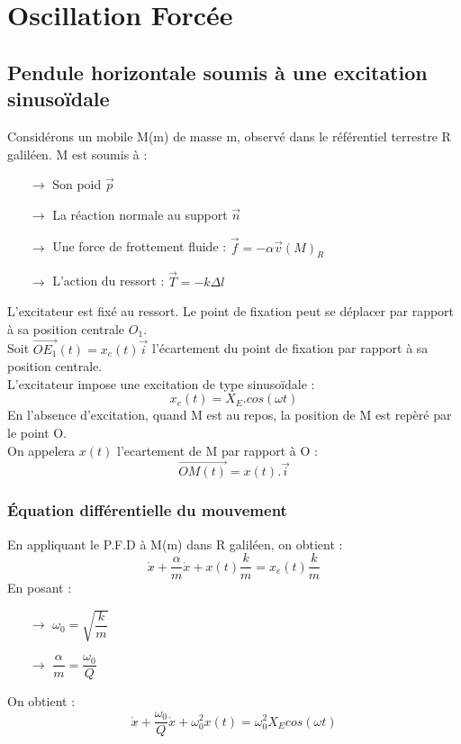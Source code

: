 \chapter{Oscillation Forcée}
\section{Pendule horizontale soumis à une excitation sinusoïdale}
Considérons un mobile M(m) de masse m, observé dans le référentiel terrestre R galiléen. M est soumis à :
\begin{itemize}
 \item[$\rightarrow$] Son poid $\overrightarrow{p}$
 \item[$\rightarrow$] La réaction normale au support $\overrightarrow{n}$
 \item[$\rightarrow$] Une force de frottement fluide : $\overrightarrow{f}=-\alpha\overrightarrow{v}(M)_R$
 \item[$\rightarrow$] L'action du ressort : $\overrightarrow{T} = -k\Delta l$
\end{itemize}
L'excitateur est fixé au ressort. Le point de fixation peut se déplacer par rapport à sa position centrale $O_1$.\\
Soit $\overrightarrow{OE_1}(t) = x_e(t)\overrightarrow{i}$ l'écartement du point de fixation par rapport à sa position centrale.\\
L'excitateur impose une excitation de type sinusoïdale :
$$x_e(t) = X_E.cos(\omega t)$$
En l'absence d'excitation, quand M est au repos, la position de M est repèré par le point O.\\
On appelera $x(t)$ l'ecartement de M par rapport à O : 
$$\overrightarrow{OM(t)} = x(t).\overrightarrow{i}$$
\subsection{Équation différentielle du mouvement}
En appliquant le P.F.D à M(m) dans R galiléen, on obtient : 
$$\mathring{x}\mathring{} + \dfrac{\alpha}{m}\mathring{x} +x(t)\dfrac{k}{m} =x_e(t)\dfrac{k}{m}$$
En posant : 
\begin{itemize}
 \item[$\rightarrow$] $\omega_0 = \sqrt{\dfrac{k}{m}}$\\
 \item[$\rightarrow$] $\dfrac{\alpha}{m} = \dfrac{\omega_0}{Q}$
\end{itemize}
On obtient :
$$\mathring{x}\mathring{} + \dfrac{\omega_0}{Q}\mathring{x} +\omega_0^2x(t) =\omega_0^2X_Ecos(\omega t)$$
